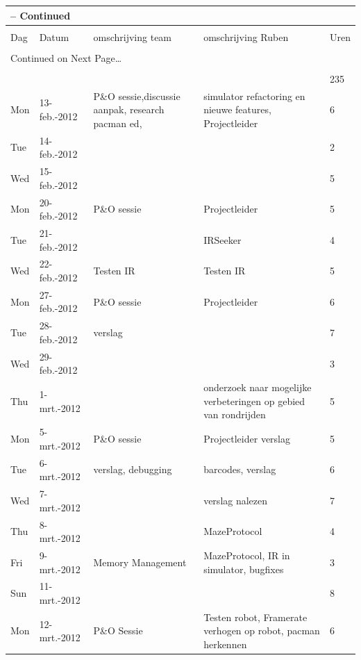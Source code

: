 \documentclass[12pt,a4paper]{report}
\begin{document}
\begin{landscape}
\begin{longtable}{llp{7cm}p{10cm}l}
\multicolumn{5}{l}{{\tablename} \thetable{} -- Continued} \\[0.5ex]
\hline \hline \\[-2ex]
  \multicolumn{1}{l}{Dag} & \multicolumn{1}{l}{Datum} &
  \multicolumn{1}{p{7cm}}{omschrijving team} &
  \multicolumn{1}{p{10cm}}{omschrijving Ruben} &
  \multicolumn{1}{l}{Uren}  \\[0.5ex] \hline \\[-1.8ex]
\endhead

\multicolumn{5}{l}{{Continued on Next Page\ldots}} \\
\endfoot

\\[-1.8ex] \hline \hline
\endlastfoot

\hline
 &  &  &  & 235 \\ 
\hline
Mon & 13-feb.-2012 & P\&O sessie,discussie aanpak, research pacman ed,  & simulator refactoring en nieuwe features, Projectleider & 6 \\ 
\hline
Tue & 14-feb.-2012 &  &  & 2 \\ 
\hline
Wed & 15-feb.-2012 &  &  & 5 \\ 
\hline
Mon & 20-feb.-2012 & P\&O sessie & Projectleider & 5 \\ 
\hline
Tue & 21-feb.-2012 &  & IRSeeker & 4 \\ 
\hline
Wed & 22-feb.-2012 & Testen IR & Testen IR & 5 \\ 
\hline
Mon & 27-feb.-2012 & P\&O sessie & Projectleider & 6 \\ 
\hline
Tue & 28-feb.-2012 & verslag &  & 7 \\ 
\hline
Wed & 29-feb.-2012 &  &  & 3 \\ 
\hline
Thu & 1-mrt.-2012 &  & onderzoek naar mogelijke verbeteringen op gebied van rondrijden & 5 \\ 
\hline
Mon & 5-mrt.-2012 & P\&O sessie & Projectleider verslag & 5 \\ 
\hline
Tue & 6-mrt.-2012 & verslag, debugging & barcodes, verslag & 6 \\ 
\hline
Wed & 7-mrt.-2012 &  & verslag nalezen & 7 \\ 
\hline
Thu & 8-mrt.-2012 &  & MazeProtocol & 4 \\ 
\hline
Fri & 9-mrt.-2012 & Memory Management & MazeProtocol, IR in simulator, bugfixes & 3 \\ 
\hline
Sun & 11-mrt.-2012 &  &  & 8 \\ 
\hline
Mon & 12-mrt.-2012 & P\&O Sessie & Testen robot, Framerate verhogen op robot, pacman herkennen & 6 \\ 

\end{longtable}
\end{landscape}
\end{document}
